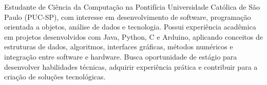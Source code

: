 \begin{cvparagraph}
Estudante de Ciência da Computação na Pontifícia Universidade Católica de São Paulo (PUC-SP), com interesse em desenvolvimento de software, programação orientada a objetos, análise de dados e tecnologia. Possui experiência acadêmica em projetos desenvolvidos com Java, Python, C e Arduino, aplicando conceitos de estruturas de dados, algoritmos, interfaces gráficas, métodos numéricos e integração entre software e hardware. Busca oportunidade de estágio para desenvolver habilidades técnicas, adquirir experiência prática e contribuir para a criação de soluções tecnológicas.
\end{cvparagraph}
